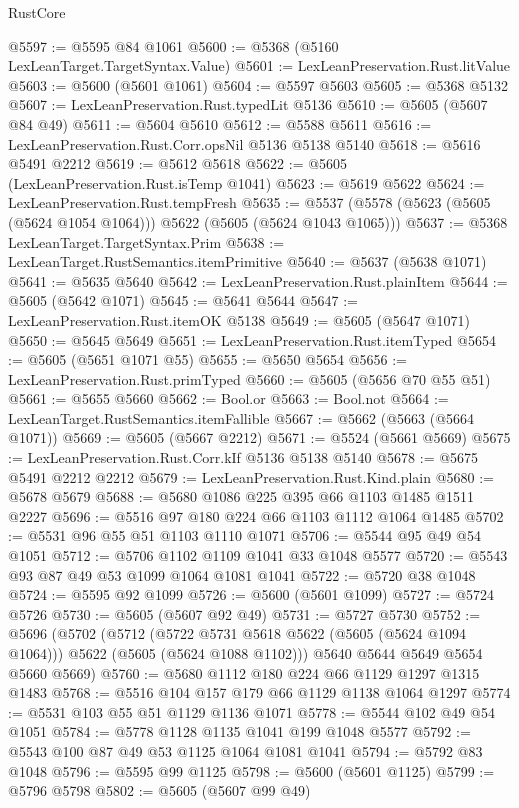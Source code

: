 \begin{lexlean}{RustCore}
\begin{coremodule}
@5597 := @5595 @84 @1061
@5600 := @5368 (@5160 LexLeanTarget.TargetSyntax.Value)
@5601 := LexLeanPreservation.Rust.litValue
@5603 := @5600 (@5601 @1061)
@5604 := @5597 @5603
@5605 := @5368 @5132
@5607 := LexLeanPreservation.Rust.typedLit @5136
@5610 := @5605 (@5607 @84 @49)
@5611 := @5604 @5610
@5612 := @5588 @5611
@5616 := LexLeanPreservation.Rust.Corr.opsNil @5136 @5138 @5140
@5618 := @5616 @5491 @2212
@5619 := @5612 @5618
@5622 := @5605 (LexLeanPreservation.Rust.isTemp @1041)
@5623 := @5619 @5622
@5624 := LexLeanPreservation.Rust.tempFresh
@5635 := @5537 (@5578 (@5623 (@5605 (@5624 @1054 @1064))) @5622 (@5605 (@5624 @1043 @1065)))
@5637 := @5368 LexLeanTarget.TargetSyntax.Prim
@5638 := LexLeanTarget.RustSemantics.itemPrimitive
@5640 := @5637 (@5638 @1071)
@5641 := @5635 @5640
@5642 := LexLeanPreservation.Rust.plainItem
@5644 := @5605 (@5642 @1071)
@5645 := @5641 @5644
@5647 := LexLeanPreservation.Rust.itemOK @5138
@5649 := @5605 (@5647 @1071)
@5650 := @5645 @5649
@5651 := LexLeanPreservation.Rust.itemTyped
@5654 := @5605 (@5651 @1071 @55)
@5655 := @5650 @5654
@5656 := LexLeanPreservation.Rust.primTyped
@5660 := @5605 (@5656 @70 @55 @51)
@5661 := @5655 @5660
@5662 := Bool.or
@5663 := Bool.not
@5664 := LexLeanTarget.RustSemantics.itemFallible
@5667 := @5662 (@5663 (@5664 @1071))
@5669 := @5605 (@5667 @2212)
@5671 := @5524 (@5661 @5669)
@5675 := LexLeanPreservation.Rust.Corr.kIf @5136 @5138 @5140
@5678 := @5675 @5491 @2212 @2212
@5679 := LexLeanPreservation.Rust.Kind.plain
@5680 := @5678 @5679
@5688 := @5680 @1086 @225 @395 @66 @1103 @1485 @1511 @2227
@5696 := @5516 @97 @180 @224 @66 @1103 @1112 @1064 @1485
@5702 := @5531 @96 @55 @51 @1103 @1110 @1071
@5706 := @5544 @95 @49 @54 @1051
@5712 := @5706 @1102 @1109 @1041 @33 @1048 @5577
@5720 := @5543 @93 @87 @49 @53 @1099 @1064 @1081 @1041
@5722 := @5720 @38 @1048
@5724 := @5595 @92 @1099
@5726 := @5600 (@5601 @1099)
@5727 := @5724 @5726
@5730 := @5605 (@5607 @92 @49)
@5731 := @5727 @5730
@5752 := @5696
    (@5702
      (@5712
        (@5722 @5731 @5618 @5622 (@5605 (@5624 @1094 @1064)))
        @5622
        (@5605 (@5624 @1088 @1102)))
      @5640
      @5644
      @5649
      @5654
      @5660
      @5669)
@5760 := @5680 @1112 @180 @224 @66 @1129 @1297 @1315 @1483
@5768 := @5516 @104 @157 @179 @66 @1129 @1138 @1064 @1297
@5774 := @5531 @103 @55 @51 @1129 @1136 @1071
@5778 := @5544 @102 @49 @54 @1051
@5784 := @5778 @1128 @1135 @1041 @199 @1048 @5577
@5792 := @5543 @100 @87 @49 @53 @1125 @1064 @1081 @1041
@5794 := @5792 @83 @1048
@5796 := @5595 @99 @1125
@5798 := @5600 (@5601 @1125)
@5799 := @5796 @5798
@5802 := @5605 (@5607 @99 @49)

\end{coremodule}
\end{lexlean}
